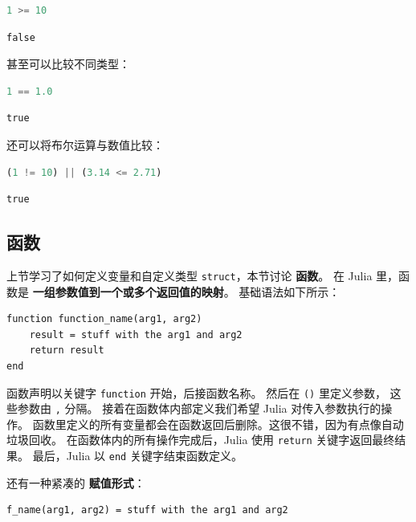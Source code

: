 \documentclass[
  notoc %
]{tufte-book}
\newcommand{\passthrough}[1]{#1}
\begin{document}
\begin{lstlisting}[language=Julia]
1 >= 10
\end{lstlisting}

\begin{lstlisting}[language=Output]
false
\end{lstlisting}

甚至可以比较不同类型：

\begin{lstlisting}[language=Julia]
1 == 1.0
\end{lstlisting}

\begin{lstlisting}[language=Output]
true
\end{lstlisting}

还可以将布尔运算与数值比较：

\begin{lstlisting}[language=Julia]
(1 != 10) || (3.14 <= 2.71)
\end{lstlisting}

\begin{lstlisting}[language=Output]
true
\end{lstlisting}

\hypertarget{sec:function}{%
\subsection{函数}\label{sec:function}}

上节学习了如何定义变量和自定义类型
\passthrough{\lstinline!struct!}，本节讨论 \textbf{函数}。 在 Julia
里，函数是 \textbf{一组参数值到一个或多个返回值的映射}。
基础语法如下所示：

\begin{lstlisting}
function function_name(arg1, arg2)
    result = stuff with the arg1 and arg2
    return result
end
\end{lstlisting}

函数声明以关键字 \passthrough{\lstinline!function!} 开始，后接函数名称。
然后在 \passthrough{\lstinline!()!} 里定义参数， 这些参数由
\passthrough{\lstinline!,!} 分隔。 接着在函数体内部定义我们希望 Julia
对传入参数执行的操作。
函数里定义的所有变量都会在函数返回后删除。这很不错，因为有点像自动垃圾回收。
在函数体内的所有操作完成后，Julia 使用 \passthrough{\lstinline!return!}
关键字返回最终结果。 最后，Julia 以 \passthrough{\lstinline!end!}
关键字结束函数定义。

还有一种紧凑的 \textbf{赋值形式}：

\begin{lstlisting}
f_name(arg1, arg2) = stuff with the arg1 and arg2
\end{lstlisting}
\end{document}
